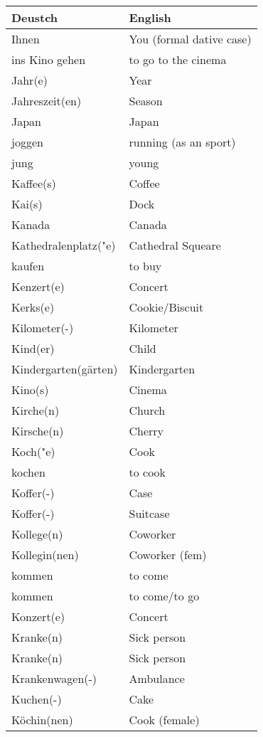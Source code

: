 \documentclass{article}
\renewcommand{\arraystretch}{1}
\begin{document}
\begin{minipage}{0.48\textwidth}
    \centering
    \renewcommand{\arraystretch}{1.5}
    \begin{tabular}{|>{\raggedright\arraybackslash}p{3.5cm}|>{\raggedright\arraybackslash}p{3.5cm}|}
        \hline
        \rowcolor{gray!20} \textbf{Deustch} & \textbf{English} \\
        \hline
        Ihnen & You (formal dative case) \\\hline
        ins Kino gehen & to go to the cinema \\\hline
        Jahr(e) & Year \\\hline
        Jahreszeit(en) & Season \\\hline
        Japan & Japan \\\hline
        joggen & running (as an sport) \\\hline
        jung & young \\\hline
        Kaffee(s) & Coffee \\\hline
        Kai(s) & Dock \\\hline
        Kanada & Canada \\\hline
        Kathedralenplatz("e) & Cathedral Squeare \\\hline
        kaufen & to buy \\\hline
        Kenzert(e) & Concert \\\hline
        Kerks(e) & Cookie/Biscuit \\\hline
        Kilometer(-) & Kilometer \\\hline
        Kind(er) & Child \\\hline
        Kindergarten(gärten) & Kindergarten \\\hline
        Kino(s) & Cinema \\\hline
        Kirche(n) & Church \\\hline
        Kirsche(n) & Cherry \\\hline
        Koch("e) & Cook \\\hline
        kochen & to cook \\\hline
        Koffer(-) & Case \\\hline
        Koffer(-) & Suitcase \\\hline
        Kollege(n) & Coworker \\\hline
        Kollegin(nen) & Coworker (fem) \\\hline
        kommen & to come \\\hline
        kommen & to come/to go \\\hline
        Konzert(e) & Concert \\\hline
        Kranke(n) & Sick person \\\hline
        Kranke(n) & Sick person \\\hline
        Krankenwagen(-) & Ambulance \\\hline
        Kuchen(-) & Cake \\\hline
        Köchin(nen) & Cook (female) \\\hline
    \end{tabular}
\end{minipage}%
\end{document}

